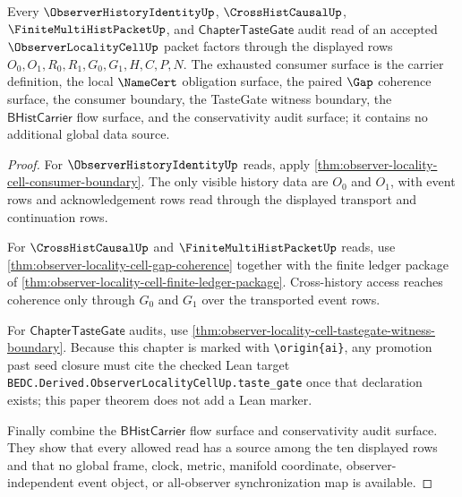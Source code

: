\begin{theorem}
\label{thm:observer-locality-cell-obligation-consumer-exhaustion}
Every $\ObserverHistoryIdentityUp$, $\CrossHistCausalUp$, $\FiniteMultiHistPacketUp$, and $\mathsf{ChapterTasteGate}$ audit read of an accepted $\ObserverLocalityCellUp$ packet factors through the displayed rows $O_0,O_1,R_0,R_1,G_0,G_1,H,C,P,N$. The exhausted consumer surface is the carrier definition, the local $\NameCert$ obligation surface, the paired $\Gap$ coherence surface, the consumer boundary, the TasteGate witness boundary, the $\mathsf{BHistCarrier}$ flow surface, and the conservativity audit surface; it contains no additional global data source.
\end{theorem}
\begin{proof}
For $\ObserverHistoryIdentityUp$ reads, apply \autoref{thm:observer-locality-cell-consumer-boundary}. The only visible history data are $O_0$ and $O_1$, with event rows and acknowledgement rows read through the displayed transport and continuation rows.

For $\CrossHistCausalUp$ and $\FiniteMultiHistPacketUp$ reads, use \autoref{thm:observer-locality-cell-gap-coherence} together with the finite ledger package of \autoref{thm:observer-locality-cell-finite-ledger-package}. Cross-history access reaches coherence only through $G_0$ and $G_1$ over the transported event rows.

For $\mathsf{ChapterTasteGate}$ audits, use \autoref{thm:observer-locality-cell-tastegate-witness-boundary}. Because this chapter is marked with \texttt{\textbackslash origin\{ai\}}, any promotion past seed closure must cite the checked Lean target \texttt{BEDC.Derived.ObserverLocalityCellUp.taste\_gate} once that declaration exists; this paper theorem does not add a Lean marker.

Finally combine the $\mathsf{BHistCarrier}$ flow surface and conservativity audit surface. They show that every allowed read has a source among the ten displayed rows and that no global frame, clock, metric, manifold coordinate, observer-independent event object, or all-observer synchronization map is available.
\end{proof}

